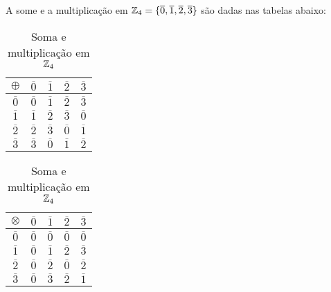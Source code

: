 \begin{exemplo}
	A some e a multiplica{\c c}{\~a}o em $\mathbb{Z}_4 = \{\overline{0},\overline{1},\overline{2},\overline{3}\}$
	são dadas nas tabelas abaixo:
		\begin{table}[!htb]
		  \caption{Soma e multiplicação em $\mathbb{Z}_4$}
		  \begin{minipage}{.5\linewidth}
		    \centering
		 	\begin{tabular}{|c|c|c|c|c|} 
			    \hline
			    $\oplus$ & $\overline{0}$ & $\overline{1}$ & $\overline{2}$ & $\overline{3}$\T\\
			    \hline
			    $\overline{0}$ & $\overline{0}$ & $\overline{1}$ & $\overline{2}$ & $\overline{3}$\T\\
			    \hline
			    $\overline{1}$ & $\overline{1}$ & $\overline{2}$ & $\overline{3}$ & $\overline{0}$\T\\
			    \hline
			    $\overline{2}$ & $\overline{2}$ & $\overline{3}$ & $\overline{0}$ & $\overline{1}$\T\\
			    \hline
			    $\overline{3}$ & $\overline{3}$ & $\overline{0}$ & $\overline{1}$ & $\overline{2}$\T\\
			    \hline
			\end{tabular}
		  \end{minipage}
		  \begin{minipage}{.5\linewidth}
		  \centering
		    \begin{tabular}{|c|c|c|c|c|} 
		      \hline
		      $\otimes$ & $\overline{0}$ & $\overline{1}$ & $\overline{2}$ & $\overline{3}$\T\\
		      \hline
		      $\overline{0}$ & $\overline{0}$ & $\overline{0}$ & $\overline{0}$ & $\overline{0}$\T\\
		      \hline
		      $\overline{1}$ & $\overline{0}$ & $\overline{1}$ & $\overline{2}$ & $\overline{3}$\T\\
		      \hline
		      $\overline{2}$ & $\overline{0}$ & $\overline{2}$ & $\overline{0}$ & $\overline{2}$\T\\
		      \hline
		      $\overline{3}$ & $\overline{0}$ & $\overline{3}$ & $\overline{2}$ & $\overline{1}$\T\\
		      \hline
			\end{tabular}
		\end{minipage}
	\end{table}
\end{exemplo}

